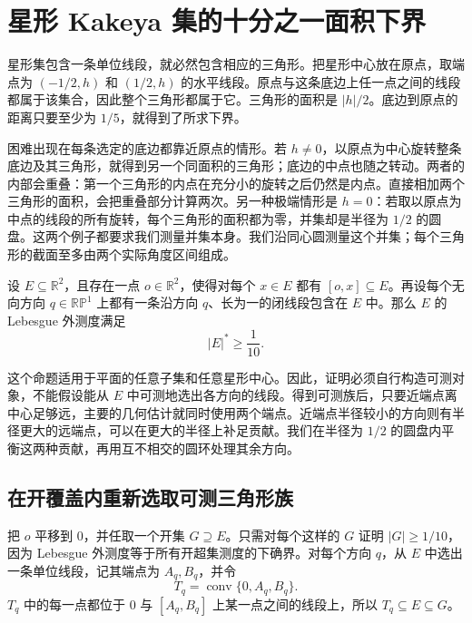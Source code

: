 
\section{星形 Kakeya 集的十分之一面积下界}
\label{sec:core-tenth}

星形集包含一条单位线段，就必然包含相应的三角形。把星形中心放在原点，取端点为 $(-1/2,h)$ 和 $(1/2,h)$ 的水平线段。原点与这条底边上任一点之间的线段都属于该集合，因此整个三角形都属于它。三角形的面积是 $|h|/2$。底边到原点的距离只要至少为 $1/5$，就得到了所求下界。

困难出现在每条选定的底边都靠近原点的情形。若 $h\ne0$，以原点为中心旋转整条底边及其三角形，就得到另一个同面积的三角形；底边的中点也随之转动。两者的内部会重叠：第一个三角形的内点在充分小的旋转之后仍然是内点。直接相加两个三角形的面积，会把重叠部分计算两次。另一种极端情形是 $h=0$：若取以原点为中点的线段的所有旋转，每个三角形的面积都为零，并集却是半径为 $1/2$ 的圆盘。这两个例子都要求我们测量并集本身。我们沿同心圆测量这个并集；每个三角形的截面至多由两个实际角度区间组成。

\begin{theorem}
\label{thm:core-tenth}
设 $E\subseteq\mathbb R^2$，且存在一点 $o\in\mathbb R^2$，使得对每个 $x\in E$ 都有 $[o,x]\subseteq E$。再设每个无向方向 $q\in\mathbb {RP}^1$ 上都有一条沿方向 $q$、长为一的闭线段包含在 $E$ 中。那么 $E$ 的 Lebesgue 外测度满足
\[
                 |E|^*\geq\frac1{10}.
\]
\end{theorem}

这个命题适用于平面的任意子集和任意星形中心。因此，证明必须自行构造可测对象，不能假设能从 $E$ 中可测地选出各方向的线段。得到可测族后，只要近端点离中心足够远，主要的几何估计就同时使用两个端点。近端点半径较小的方向则有半径更大的远端点，可以在更大的半径上补足贡献。我们在半径为 $1/2$ 的圆盘内平衡这两种贡献，再用互不相交的圆环处理其余方向。

\subsection{在开覆盖内重新选取可测三角形族}
\label{subsec:core-recovery}

把 $o$ 平移到 $0$，并任取一个开集 $G\supseteq E$。只需对每个这样的 $G$ 证明 $|G|\geq1/10$，因为 Lebesgue 外测度等于所有开超集测度的下确界。对每个方向 $q$，从 $E$ 中选出一条单位线段，记其端点为 $A_q,B_q$，并令
\[
                  T_q=\operatorname{conv}\{0,A_q,B_q\}.
\]
$T_q$ 中的每一点都位于 $0$ 与 $[A_q,B_q]$ 上某一点之间的线段上，所以 $T_q\subseteq E\subseteq G$。

